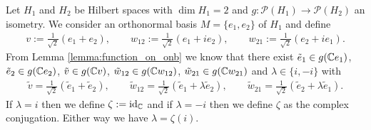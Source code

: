 \begin{example} \label{example:twodim}
	Let $H_1$ and $H_2$ be Hilbert spaces with $\dim H_1 = 2$ and $g: \mathcal{P}(H_1) \to \mathcal{P}(H_2)$ an isometry. We consider an orthonormal basis $M = \{e_1, e_2\}$ of $H_1$ and define
	\begin{align*}
		v := \frac{1}{\sqrt{2}}(e_1 + e_2), \qquad w_{12} := \frac{1}{\sqrt{2}}(e_1 + i e_2), \qquad  w_{21} := \frac{1}{\sqrt{2}}(e_2 + i e_1).
	\end{align*} 
	From Lemma \ref{lemma:function_on_onb} we know that there exist $\tilde{e}_1 \in g(\mathbb{C} e_1)$, $\tilde{e}_2 \in g(\mathbb{C} e_2)$, $\tilde{v} \in g(\mathbb{C} v)$, $\tilde{w}_{12} \in g(\mathbb{C} w_{12})$, $\tilde{w}_{21} \in g(\mathbb{C} w_{21})$ and $\lambda \in \{i, -i\}$ with
	\begin{align*}
		\tilde{v} = \frac{1}{\sqrt{2}}(\tilde{e}_1 + \tilde{e}_2), \qquad \tilde{w}_{12} = \frac{1}{\sqrt{2}}(\tilde{e}_1 + \lambda \tilde{e}_2), \qquad \tilde{w}_{21} = \frac{1}{\sqrt{2}}(\tilde{e}_2 + \lambda \tilde{e}_1).
	\end{align*} 
	If $\lambda = i$ then we define $\zeta := \operatorname{id}_{\mathbb{C}}$ and if $\lambda = -i$ then we define $\zeta$ as the complex conjugation. Either way we have $\lambda = \zeta(i)$.
	

\end{example}
